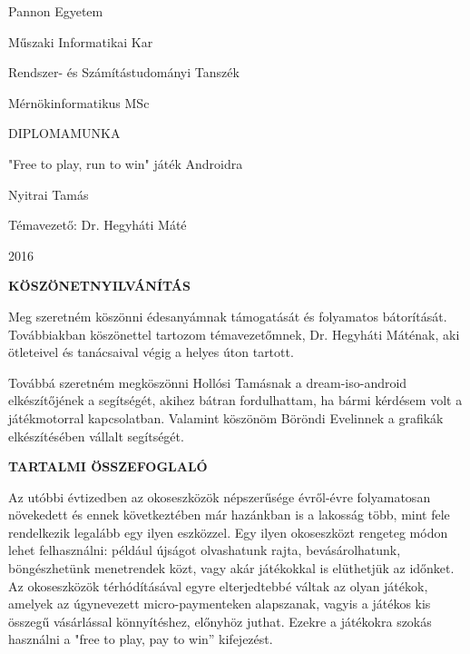 \documentclass[a4paper,oneside,10pt]{report}
\begin{document}
\begin{titlepage}
\begin{center}
\Large
Pannon Egyetem

\vspace{10mm}
Műszaki Informatikai Kar

\vspace{10mm}
Rendszer- és Számítástudományi Tanszék

\vspace{10mm}
Mérnökinformatikus MSc

\vspace{40mm}
\huge
DIPLOMAMUNKA

\vspace{10mm}
\LARGE
"Free to play, run to win" játék Androidra

\vspace{10mm}
\Large
Nyitrai Tamás

\vspace{40mm}
Témavezető: Dr. Hegyháti Máté

\vspace{10mm}
2016
\normalsize
\end{center}
\end{titlepage}



\pagestyle{empty} %



\newpage
\Large
\begin{center}
	\textbf{KÖSZÖNETNYILVÁNÍTÁS}
\end{center}
\normalsize
\noindent
Meg szeretném köszönni édesanyámnak támogatását és folyamatos bátorítását. Továbbiakban köszönettel tartozom témavezetőmnek, Dr. Hegyháti Máténak, aki ötleteivel és tanácsaival végig a helyes úton tartott.

Továbbá szeretném megköszönni Hollósi Tamásnak a dream-iso-android elkészítőjének a segítségét, akihez bátran fordulhattam, ha bármi kérdésem volt a játékmotorral kapcsolatban. Valamint köszönöm Böröndi Evelinnek a grafikák elkészítésében vállalt segítségét.
\newpage
\Large
\begin{center}
	\textbf{TARTALMI ÖSSZEFOGLALÓ}
\end{center}
\normalsize
\noindent

Az utóbbi évtizedben az okoseszközök népszerűsége évről-évre folyamatosan növekedett és ennek következtében már hazánkban is a lakosság több, mint fele rendelkezik legalább egy ilyen eszközzel. 
Egy ilyen okoseszközt rengeteg módon lehet felhasználni: például újságot olvashatunk rajta, bevásárolhatunk, böngészhetünk menetrendek közt, vagy akár játékokkal is elüthetjük az időnket. 
Az okoseszközök térhódításával egyre elterjedtebbé váltak az olyan játékok, amelyek az úgynevezett micro-paymenteken alapszanak, vagyis a játékos kis összegű vásárlással könnyítéshez, előnyhöz juthat. Ezekre a játékokra szokás használni a "free to play, pay to win” kifejezést.
\end{document}
